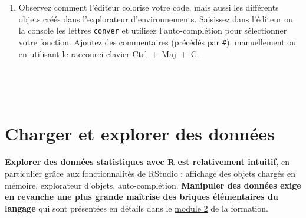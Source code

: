\documentclass[12pt,twosided, notitlepage]{book}
\newenvironment{Shaded}{}{}
\newcommand{\KeywordTok}[1]{\textcolor[rgb]{0.00,0.00,1.00}{#1}}
\newcommand{\DecValTok}[1]{#1}
\newcommand{\StringTok}[1]{\textcolor[rgb]{0.00,0.50,0.50}{#1}}
\newcommand{\CommentTok}[1]{\textcolor[rgb]{0.00,0.50,0.00}{#1}}
\newcommand{\ControlFlowTok}[1]{\textcolor[rgb]{0.00,0.00,1.00}{#1}}
\newcommand{\OperatorTok}[1]{#1}
\newcommand{\NormalTok}[1]{#1}
\newif \ifsol
\renewenvironment{Shaded}{\begin{snugshade}}{\end{snugshade}}
\begin{document}
\begin{enumerate}
  \ifsol 

  \begin{center} \rule{0.5\linewidth}{\linethickness}\end{center}

\begin{Shaded}
\begin{Highlighting}[]
\CommentTok{# On reprend les éléments du cas pratique 1.1 pour rendre la fonction}
\CommentTok{# véritablement opérante :}
\NormalTok{conversion <-}\StringTok{ }\ControlFlowTok{function}\NormalTok{(duree)\{}
\NormalTok{  min <-}\StringTok{ }\NormalTok{duree }\OperatorTok{%
\NormalTok{  sec <-}\StringTok{ }\NormalTok{duree }\OperatorTok{%
\NormalTok{  resultat <-}\StringTok{ }\KeywordTok{paste}\NormalTok{(}
    \StringTok{"Le traitement a duré"}\NormalTok{, min, }\StringTok{"minutes et"}\NormalTok{, sec, }\StringTok{"secondes."}
\NormalTok{  )}
  \KeywordTok{return}\NormalTok{(resultat)}
\NormalTok{\}}
\KeywordTok{conversion}\NormalTok{(}\DecValTok{2456}\NormalTok{)}
\NormalTok{  ## [1] "Le traitement a duré 40 minutes et 56 secondes."}
\KeywordTok{conversion}\NormalTok{(}\DecValTok{7564}\NormalTok{)}
\NormalTok{  ## [1] "Le traitement a duré 126 minutes et 4 secondes."}
\end{Highlighting}
\end{Shaded}

  \begin{center} \rule{0.5\linewidth}{\linethickness}\end{center}

  \bigskip  \fi 
\item
  Observez comment l'éditeur colorise votre code, mais aussi les
  différents objets créés dans l'explorateur d'environnements. Saisissez
  dans l'éditeur ou la console les lettres \texttt{conver} et utilisez
  l'auto-complétion pour sélectionner votre fonction. Ajoutez des
  commentaires (précédés par \texttt{\#}), manuellement ou en utilisant
  le raccourci clavier Ctrl~+~Maj~+~C.
\end{enumerate}

~

~

\section{Charger et explorer des
données}\label{charger-et-explorer-des-donnees}

\textbf{Explorer des données statistiques avec R est relativement
intuitif}, en particulier grâce aux fonctionnalités de RStudio :
affichage des objets chargés en mémoire, explorateur d'objets,
auto-complétion. \textbf{Manipuler des données exige en revanche une
plus grande maîtrise des briques élémentaires du langage} qui sont
présentées en détails dans le \underline{module 2} de la formation.
\end{document}
